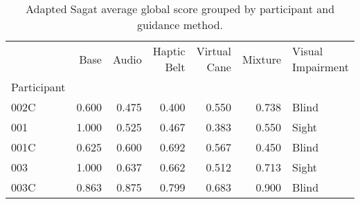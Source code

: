 
\begin{table}[!htb]
\centering
\caption{Adapted Sagat average global score grouped by participant and guidance method.}
\label{tab:sagat_average}
\begin{tabular}{lrrrrrl}
\toprule
{} &  Base &  Audio &  Haptic Belt &  Virtual Cane &  Mixture & Visual Impairment \\
Participant &       &        &              &               &          &                   \\
\midrule
002C        & 0.600 &  0.475 &        0.400 &         0.550 &    0.738 &             Blind \\
001         & 1.000 &  0.525 &        0.467 &         0.383 &    0.550 &             Sight \\
001C        & 0.625 &  0.600 &        0.692 &         0.567 &    0.450 &             Blind \\
003         & 1.000 &  0.637 &        0.662 &         0.512 &    0.713 &             Sight \\
003C        & 0.863 &  0.875 &        0.799 &         0.683 &    0.900 &             Blind \\
\bottomrule
\end{tabular}
\end{table}

